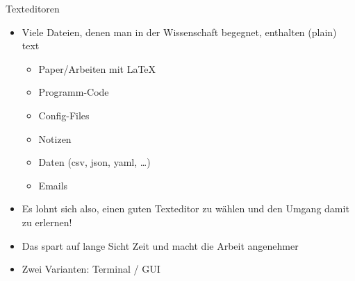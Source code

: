 

\begin{frame}{Texteditoren}
  \begin{itemize}
    \item Viele Dateien, denen man in der Wissenschaft begegnet, enthalten (plain) text
      \begin{itemize}
        \item Paper/Arbeiten mit \LaTeX
        \item Programm-Code
        \item Config-Files
        \item Notizen
        \item Daten (csv, json, yaml, …)
        \item Emails
      \end{itemize}
    \item Es lohnt sich also, einen guten Texteditor zu wählen und den Umgang damit zu erlernen!
    \item Das spart auf lange Sicht Zeit und macht die Arbeit angenehmer
    \item Zwei Varianten: Terminal / GUI
  \end{itemize}
\end{frame}

